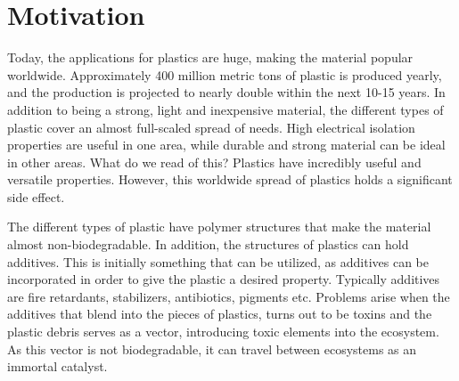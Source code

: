 \section{Motivation}



Today, the applications for plastics are huge, making the material popular worldwide. %
Approximately 400 million metric tons of plastic is produced yearly, and the production is projected to nearly double within the next 10-15 years. %
In addition to being a strong, light and inexpensive material, the different types of plastic cover an almost full-scaled spread of needs. High electrical isolation properties are useful in one area, while durable and strong material can be ideal in other areas. What do we read of this? Plastics have incredibly useful and versatile properties. However, this worldwide spread of plastics holds a significant side effect. 

The different types of plastic have polymer structures that make the material almost non-biodegradable. In addition, the structures of plastics can hold additives. This is initially something that can be utilized, as additives can be incorporated in order to give the plastic a desired property. Typically additives are fire retardants, stabilizers, antibiotics, pigments etc. %
Problems arise when the additives that blend into the pieces of plastics, turns out to be toxins and the plastic debris serves as a vector, introducing toxic elements into the ecosystem. As this vector is not biodegradable, it can travel between ecosystems as an immortal catalyst.

